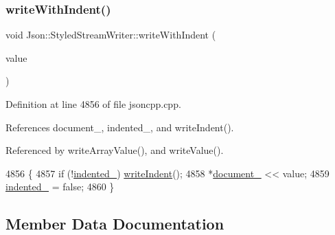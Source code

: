 \mbox{\label{class_json_1_1_styled_stream_writer_a4e64789373b359c9b7a7244509b918fc}} 
\subsubsection{\texorpdfstring{write\+With\+Indent()}{writeWithIndent()}}
{\footnotesize\ttfamily void Json\+::\+Styled\+Stream\+Writer\+::write\+With\+Indent (\begin{DoxyParamCaption}\item[{const \hyperlink{json_8h_a1e723f95759de062585bc4a8fd3fa4be}{J\+S\+O\+N\+C\+P\+P\+\_\+\+S\+T\+R\+I\+NG} \&}]{value }\end{DoxyParamCaption})\hspace{0.3cm}{\ttfamily [private]}}



Definition at line 4856 of file jsoncpp.\+cpp.



References document\+\_\+, indented\+\_\+, and write\+Indent().



Referenced by write\+Array\+Value(), and write\+Value().


\begin{DoxyCode}
4856                                                                     \{
4857   \textcolor{keywordflow}{if} (!\hyperlink{class_json_1_1_styled_stream_writer_aa12db1753619a9b48da41f3e45e3275d}{indented\_}) \hyperlink{class_json_1_1_styled_stream_writer_a5a52fa5b406f1580a61dde3b5638e76d}{writeIndent}();
4858   *\hyperlink{class_json_1_1_styled_stream_writer_aa8c4e4576f5c3dcb10955d133a092dd6}{document\_} << value;
4859   \hyperlink{class_json_1_1_styled_stream_writer_aa12db1753619a9b48da41f3e45e3275d}{indented\_} = \textcolor{keyword}{false};
4860 \}
\end{DoxyCode}


\subsection{Member Data Documentation}
\mbox{\label{class_json_1_1_styled_stream_writer_a4e4bb7fc223b2652b72b523b1ce414fa}} 
